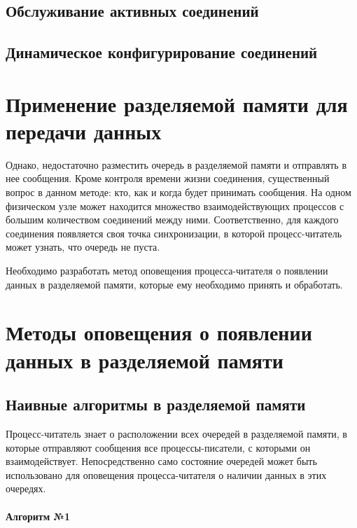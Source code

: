 
\subsection{Обслуживание активных соединений}


\subsection{Динамическое конфигурирование соединений}


\section{Применение разделяемой памяти для передачи данных}


Однако, недостаточно разместить очередь в разделяемой памяти и отправлять в нее сообщения. Кроме контроля времени жизни соединения, существенный вопрос в данном методе: кто, как и когда будет принимать сообщения. На одном физическом узле может находится множество взаимодействующих процессов с большим количеством соединений между ними. Соответственно, для каждого соединения появляется своя точка синхронизации, в которой процесс-читатель может узнать, что очередь не пуста.

Необходимо разработать метод оповещения процесса-читателя о появлении данных в разделяемой памяти, которые ему необходимо принять и обработать.

\section{Методы оповещения о появлении данных в разделяемой памяти}

\subsection{Наивные алгоритмы в разделяемой памяти}

Процесс-читатель знает о расположении всех очередей в разделяемой памяти, в которые отправляют сообщения все процессы-писатели, с которыми он взаимодействует. Непосредственно само состояние очередей может быть использовано для оповещения процесса-читателя о наличии данных в этих очередях.

\paragraph{Алгоритм №1}

